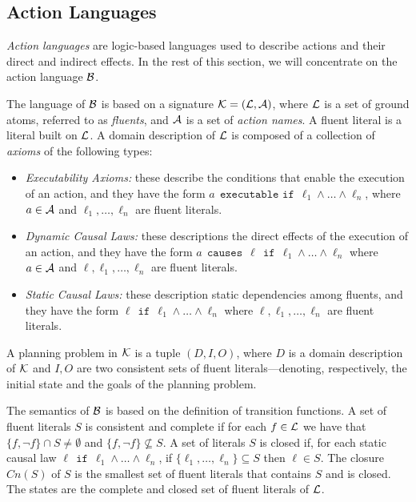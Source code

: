 \documentclass{article}
\def\executable{\:\: \texttt{executable if} \:\:}
\newcommand{\causesif}[1]{\:\: \texttt{causes} \:\: {#1} \:\: \texttt{if} \:\:}
\newcommand{\ifthen}{\:\:\texttt{if} \:\:}
\begin{document}
\subsection{Action Languages}
\emph{Action languages} \cite{gl98,causal2} are logic-based languages
used to describe actions and their direct and indirect effects. In the rest
of this section, we will concentrate on the action language $\cal B$.

The language of $\cal B$ is based on a signature ${\cal K} = ({\cal L}, {\cal A})$, where
$\cal L$ is a set of ground atoms, referred to as \emph{fluents},
 and $\cal A$ is a set of \emph{action names}. A fluent literal is a literal
 built on $\cal L$.
 A domain description of $\cal L$ is composed of a collection of \emph{axioms} of 
 the following types:
\begin{itemize} 
 \item \emph{Executability Axioms:} these describe the conditions that enable the
         execution of an action, and they have the form $a \executable \ell_1\wedge \dots\wedge \ell_n$,
         where $a\in {\cal A}$ and $\ell_1,\dots,\ell_n$ are fluent literals.
  \item \emph{Dynamic Causal Laws:} these descriptions the direct effects of the execution
          of an action, and they have the form
          $a \causesif{\ell} \ell_1\wedge \dots \wedge \ell_n$
          where $a\in {\cal A}$ and $\ell,\ell_1,\dots,\ell_n$ are fluent literals.
  \item \emph{Static Causal Laws:} these description static dependencies among fluents, and they
          have the form
          $\ell \ifthen \ell_1\wedge\dots\wedge\ell_n$
          where $\ell, \ell_1,\dots,\ell_n$ are fluent literals.
 \end{itemize} 
 A planning problem in $\cal K$ is a tuple $(D, I, O)$, where $D$ is a domain description
 of $\cal K$ and $I, O$ are two consistent sets of fluent literals---denoting, respectively,
 the initial state and the goals of the planning problem.

The semantics of $\cal B$ is based on the definition of transition functions. A set of fluent
literals $S$ 
is consistent and complete if for each $f \in {\cal L}$ we 
have that $\{f,\neg f\}\cap S \neq \emptyset$ and $\{f,\neg f\} \not\subseteq S$. A
set of literals $S$ is closed if, for each static causal law $\ell \ifthen \ell_1\wedge\dots\wedge \ell_n$,
if $\{\ell_1,\dots,\ell_n\}\subseteq S$ then $\ell\in S$. The closure $Cn(S)$ of $S$ is the 
smallest set of fluent literals that contains $S$ and is closed. The states are the complete
and closed set of fluent literals of $\cal L$. 
\end{document}
